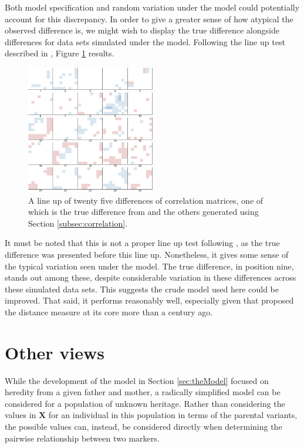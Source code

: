 \documentclass{article}
\newcommand{\m}[1]{\mathbf{#1}}               %
\begin{document}
Both model specification and random variation under the model could potentially account for this discrepancy. In order to give a greater sense of how atypical the observed difference is, we might wish to display the true difference alongside differences for data sets simulated under the model. Following the line up test described in \cite{bujaetal2009}, Figure \ref{fig:lineup} results.

\begin{figure}[htp]
  \begin{center}
    \includegraphics[width = 0.5\textwidth]{./img/lineup.png}
  \end{center}
  \caption{A line up of twenty five differences of correlation matrices, one of which is the true difference from \cite{cheverudetal2001} and the others generated using Section \ref{subsec:correlation}.}
  \label{fig:lineup}
\end{figure}

It must be noted that this is not a proper line up test following \cite{bujaetal2009}, as the true difference was presented before this line up. Nonetheless, it gives some sense of the typical variation seen under the model. The true difference, in position nine, stands out among these, despite considerable variation in these differences across these simulated data sets. This suggests the crude model used here could be improved. That said, it performs reasonably well, especially given that \cite{haldane1919} proposed the distance measure at its core more than a century ago.

\section{Other views} \label{sec:apply}

While the development of the model in Section \ref{sec:theModel} focused on heredity from a given father and mother, a radically simplified model can be considered for a population of unknown heritage. Rather than considering the values in $\m{X}$ for an individual in this population in terms of the parental variants, the possible values can, instead, be considered directly when determining the pairwise relationship between two markers.
\end{document}
